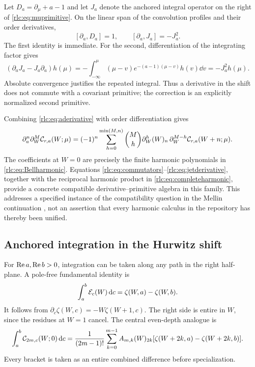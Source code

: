 Let $D_a=\partial_\mu+a-1$ and let $J_a$ denote the anchored integral
operator on the right of \eqref{rlc:eq:muprimitive}. On the linear span
of the convolution profiles and their order derivatives,
\begin{equation}\label{rlc:eq:commutators}
 [\partial_a,D_a]=1,\qquad
 [\partial_a,J_a]=-J_a^2.
\end{equation}
The first identity is immediate. For the second, differentiation of the
integrating factor gives
\[
 (\partial_aJ_a-J_a\partial_a)h(\mu)
   =-\int_{-\infty}^{\mu}(\mu-v)e^{-(a-1)(\mu-v)}h(v)\dd v
   =-J_a^2h(\mu).
\]
Absolute convergence justifies the repeated integral. Thus a derivative
in the shift does not commute with a covariant primitive; the correction
is an explicitly normalized second primitive.

Combining \eqref{rlc:eq:aderivative} with order differentiation gives
\begin{equation}\label{rlc:eq:jetderivative}
 \partial_a^n\partial_W^M\mathcal C_{r,a}(W;\mu)
 =(-1)^n\sum_{h=0}^{\min(M,n)}\binom Mh
       \partial_W^h(W)_n\,
       \partial_W^{M-h}\mathcal C_{r,a}(W+n;\mu).
\end{equation}
The coefficients at $W=0$ are precisely the finite harmonic
polynomials in \eqref{rlc:eq:Bellharmonic}. Equations
\eqref{rlc:eq:commutators}--\eqref{rlc:eq:jetderivative}, together with
the reciprocal harmonic product in \eqref{rlc:eq:completeharmonic},
provide a concrete compatible derivative--primitive algebra in this
family. This addresses a specified instance of the compatibility
question in the Mellin continuation \cite{MLD}, not an assertion that
every harmonic calculus in the repository has thereby been unified.

\subsection{Anchored integration in the Hurwitz shift}
For $\operatorname{Re} a,\operatorname{Re} b>0$, integration can be taken along any path in the
right half-plane. A pole-free fundamental identity is
\begin{equation}\label{rlc:eq:Eprimitive}
 \int_a^b\mathcal E_c(W)\,\mathrm d c=\zeta(W,a)-\zeta(W,b).
\end{equation}
It follows from $\partial_c\zeta(W,c)=-W\zeta(W+1,c)$.
The right side is entire in $W$, since the residues at $W=1$ cancel.
The central even-depth analogue is
\begin{equation}\label{rlc:eq:evenprimitive}
 \int_a^b\mathcal C_{2m,c}(W;0)\,\mathrm d c
 =\frac1{(2m-1)!}\sum_{k=0}^{m-1}A_{m,k}(W)_{2k}
      [\zeta(W+2k,a)-\zeta(W+2k,b)].
\end{equation}
Every bracket is taken as an entire combined difference before
specialization.

